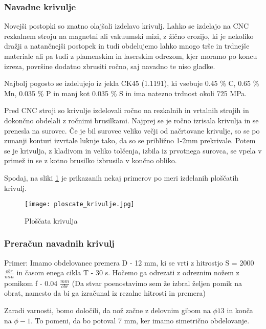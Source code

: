\subsubsection{Navadne krivulje}
Novejši postopki so znatno olajšali izdelavo krivulj.
Lahko se izdelajo na CNC rezkalnem stroju na magnetni ali vakuumski mizi,
z žično erozijo, ki je nekoliko dražji a natančnejši postopek in tudi
obdelujemo lahko mnogo trše in trdnejše materiale ali pa tudi z
plamenskim in laserskim odrezom, kjer moramo po koncu izreza, površine
dodatno zbrusiti ročno, saj navadno te niso gladke.

Najbolj pogosto se izdelujejo iz jekla CK45 (1.1191), ki vsebuje
0.45 \% C, 0.65 \% Mn, 0.035 \% P in manj kot 0.035 \% S in ima natezno trdnost okoli 725 MPa.

Pred CNC stroji so krivulje izdelovali ročno na rezkalnih in vrtalnih strojih
in dokončno obdelali z ročnimi brusilkami.
Najprej se je ročno izrisala krivulja in se prenesla na surovec.
Če je bil surovec veliko večji od načrtovane krivulje, so se po
zunanji konturi izvrtale luknje tako, da so se približno 1-2mm
prekrivale. Potem se je krivulja, z kladivom in veliko tolčenja, izbila iz prvotnega surovca,
se vpela v primež in se z kotno brusilko izbrusila v končno obliko.

Spodaj, na sliki \ref{ploscate_krivulje} je prikazanih nekaj primerov
po meri izdelanih ploščatih krivulj.

\begin{figure}[H]
	\begin{center}
		\texttt{[image: ploscate\_krivulje.jpg]}
		\caption{Ploščata krivulja
			\cite{lasten}}
		\label{ploscate_krivulje}
	\end{center}
\end{figure}

\subsubsection{Preračun navadnih krivulj}
\label{izracun_krivulj}
Primer: Imamo obdelovanec premera D - 12 mm, ki se vrti z hitrostjo S = 2000 \( \frac{obr}{min} \)
in časom enega cikla T - 30 s. Hočemo ga odrezati z odreznim nožem z pomikom f - 0.04 \( \frac{mm}{obr} \)
(Da stvar poenostavimo sem že izbral željen pomik na obrat, namesto da bi ga
izračunal iz rezalne hitrosti in premera)

Zaradi varnosti, bomo določili, da nož začne z delovnim gibom
na $\phi13$ in konča na $\phi-1$. To pomeni, da bo potoval 7 mm, ker
imamo simetrično obdelovanje.

